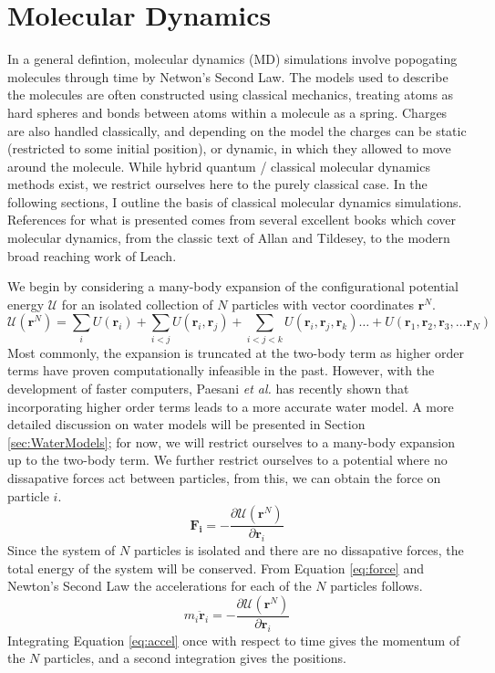 \section{Molecular Dynamics}
In a general defintion, molecular dynamics (MD) simulations involve
popogating molecules through time by Netwon's Second Law. The models
used to describe the molecules are often constructed using classical
mechanics, treating atoms as hard spheres and bonds between atoms
within a molecule as a spring. Charges are also handled classically,
and depending on the model the charges can be static (restricted to
some initial position), or dynamic, in which they allowed to move
around the molecule. While hybrid quantum / classical molecular
dynamics methods exist, we restrict ourselves here to the purely
classical case. In the following sections, I outline the basis of
classical molecular dynamics simulations. References for what is
presented comes from several excellent books which cover molecular
dynamics, from the classic text of Allan and Tildesey, to the modern
broad reaching work of Leach.\cite{AllanXX,LeachYY}

We begin by considering a many-body expansion of the configurational
potential energy $\mathscr{U}$ for an isolated collection of $N$ particles with
vector coordinates $\mathbf{r}^N$.
\begin{equation}\label{eq:potE}
\mathscr{U}(\mathbf{r}^N) = \sum_i U(\mathbf{r}_i) + \sum_{i<j}
U(\mathbf{r}_i,\mathbf{r}_j) + \sum_{i<j<k} U(\mathbf{r}_i,\mathbf{r}_j,\mathbf{r}_k) \dots + U(\mathbf{r}_1,\mathbf{r}_2,\mathbf{r}_3,\dots \mathbf{r}_N)
\end{equation}
Most commonly, the expansion is truncated at the two-body term as
higher order terms have proven computationally infeasible in the
past. However, with the development of faster computers, Paesani
\textit{et al.} has recently shown that incorporating higher order
terms leads to a more accurate water model.\cite{PaesaniXX} A more
detailed discussion on water models will be presented in Section
\ref{sec:WaterModels}; for now, we will restrict ourselves to a
many-body expansion up to the two-body term. We further restrict
ourselves to a potential where no dissapative forces act between
particles, from this, we can obtain the force on particle $i$.
\begin{equation}\label{eq:force}
\mathbf{F_i} = -\frac{\partial \mathscr{U}(\mathbf{r}^N)}{\partial \mathbf{r}_i}
\end{equation} 
Since the system of $N$ particles is isolated and there are no
dissapative forces, the total energy of the system will be
conserved. From Equation \eqref{eq:force} and Newton's Second Law the
accelerations for each of the $N$ particles follows.
\begin{equation}\label{eq:accel}
 m_i\mathbf{\ddot{r}}_i = -\frac{\partial \mathscr{U}(\mathbf{r}^N)}{\partial \mathbf{r}_i}
\end{equation}
Integrating Equation \eqref{eq:accel} once with respect to time gives
the momentum of the $N$ particles, and a second integration gives the
positions.


